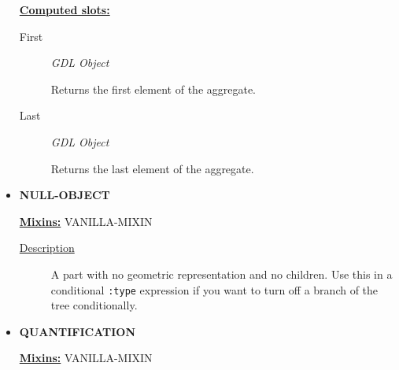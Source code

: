 \documentclass [11pt]{book}
\begin{document}
\begin{itemize}
\begin{description}
\end{description}








\textbf{
\underline{Computed slots:}}

\begin{description}

\item [First]
\emph{GDL Object}

 Returns the first element of the aggregate.




\item [Last]
\emph{GDL Object}

 Returns the last element of the aggregate.




\end{description}







\item {}
\textbf{NULL-OBJECT}


\textbf{
\underline{Mixins:}} VANILLA-MIXIN





\begin{description}

\item [
\underline{Description}]


A part with no geometric representation and no children. Use this in a 
conditional \texttt{:type} expression if you want to turn off a branch of the tree conditionally.



\end{description}









\item {}
\textbf{QUANTIFICATION}


\textbf{
\underline{Mixins:}} VANILLA-MIXIN





\begin{description}


\end{description}
\end{itemize}
\end{document}
